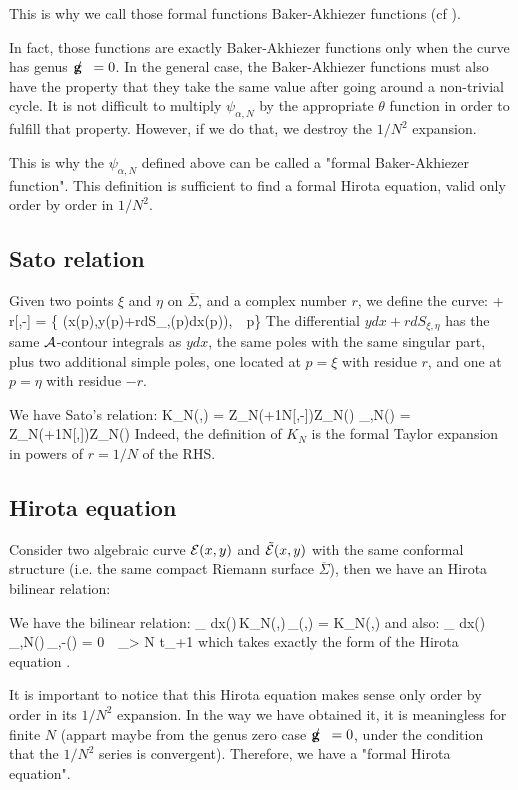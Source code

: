 This is why we call those formal functions Baker-Akhiezer functions (cf \cite{BBT}).


\br
In fact, those functions are exactly Baker-Akhiezer functions only when the curve has genus ${\mathbf g \!\!\! /\;\;}=0$.
In the general case, the Baker-Akhiezer functions must also have the property that they take the same value after going around a non-trivial cycle.
It is not difficult to multiply $\psi_{\alpha,N}$ by the appropriate $\theta$ function in order to fulfill that property. However, if we do that, we destroy the $1/N^2$ expansion.

This is why the $\psi_{\alpha,N}$ defined above can be called a "formal Baker-Akhiezer function".
This definition is sufficient to find a formal Hirota equation, valid only order by order in $1/N^2$.

\er



\subsection{Sato relation}

Given two points $\xi$ and $\eta$ on $\overline{\Sigma}$, and a complex number $r$, we define the curve:
\beq
\curve + r[\xi,-\eta] = \left\{ \left(x(p),y(p)+r{dS_{\xi,\eta}(p)\over dx(p)}\right)\quad , \,\, p\in \Sigma  \right\}
\eeq
The differential $ydx + rdS_{\xi,\eta}$ has  the same ${\cal A}$-contour integrals as $ydx$, the same poles with the same singular part, plus two additional simple poles, one located at $p=\xi$ with residue $r$,
and one at $p=\eta$ with residue $-r$.

We have Sato's relation:
\bt\label{thSato}
\beq
K_N(\xi,\eta) = {Z_N(\curve+{1\over N}[\xi,-\eta])\over Z_N(\curve)}
\virg
\psi_{\alpha,N}(\xi) = {Z_N(\curve+{1\over N}[\xi,\alpha])\over Z_N(\curve)}
\eeq
\et
Indeed, the definition of $K_N$ is the formal Taylor expansion in powers of $r=1/N$ of the RHS.



\subsection{Hirota equation}

Consider two algebraic curve ${\cal E}(x,y)$ and ${\tilde{{\cal E}}}(x,y)$
 with the same conformal structure (i.e. the same compact Riemann surface $\overline\Sigma$), 
then we have an Hirota bilinear relation:

\bt\label{thHirota}
We have the bilinear relation:
\beq
\Res_{\eta\to\zeta} dx(\eta)\,K_N(\xi,\eta)\,_{}(\eta,\zeta) = K_N(\xi,\zeta)
\eeq
and also:
\beq\label{hirotapsi}
\Res_{\xi\to \alpha} dx(\xi)\,\psi_{\alpha,N}(\xi)\,\td{\psi}_{\alpha,-}(\xi) = 0 \qquad {}\,\, _\alpha >  N t_\alpha+1
\eeq
which takes exactly the form of the Hirota equation \cite{BBT, kostovhirota}.
\et

It is important to notice that this Hirota equation makes sense only order by order in its $1/N^2$ expansion. In the way we have obtained it, it is meaningless for finite $N$ (appart maybe from the genus zero case ${\mathbf g \!\!\! /\;\;}=0$, under the condition that the $1/N^2$ series is convergent).
Therefore, we have a "formal Hirota equation".

